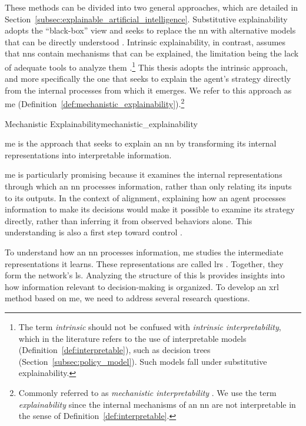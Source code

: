 These methods can be divided into two general approaches, which are detailed in Section~\ref{subsec:explainable_artificial_intelligence}.
Substitutive explainability adopts the \enquote{black-box} view and seeks to replace the \gls{nn} with alternative models that can be directly understood \parencite{rudin2019stop}.
Intrinsic explainability, in contrast, assumes that \glspl{nn} contain mechanisms that can be explained, the limitation being the lack of adequate tools to analyze them \parencite{olah2020zoom}.\footnote{The term \emph{intrinsic} should not be confused with \emph{intrinsic interpretability}, which in the literature refers to the use of interpretable models (Definition~\ref{def:interpretable}), such as decision trees (Section~\ref{subsec:policy_model}). Such models fall under substitutive explainability.}
This thesis adopts the intrinsic approach, and more specifically the one that seeks to explain the agent's strategy directly from the internal processes from which it emerges.
We refer to this approach as \gls{me} (Definition~\ref{def:mechanistic_explainability}).\footnote{Commonly referred to as \emph{mechanistic interpretability} \parencite{bereska2024mechanistic}. We use the term \emph{explainability} since the internal mechanisms of an \gls{nn} are not interpretable in the sense of Definition~\ref{def:interpretable}.}

\begin{definition}{Mechanistic Explainability}{mechanistic_explainability}

\gls{me} is the approach that seeks to explain an \gls{nn} by transforming its internal representations into interpretable information.

\end{definition}

\gls{me} is particularly promising because it examines the internal representations through which an \gls{nn} processes information, rather than only relating its inputs to its outputs.
In the context of alignment, explaining how an agent processes information to make its decisions would make it possible to examine its strategy directly, rather than inferring it from observed behaviors alone.
This understanding is also a first step toward control \parencite{mini2023understanding}.

To understand how an \gls{nn} processes information, \gls{me} studies the intermediate representations it learns.
These representations are called \glspl{lr} \parencite{bengio2014representationlearningreviewnew}.
Together, they form the network's \gls{ls}.
Analyzing the structure of this \gls{ls} provides insights into how information relevant to decision-making is organized.
To develop an \gls{xrl} method based on \gls{me}, we need to address several research questions.